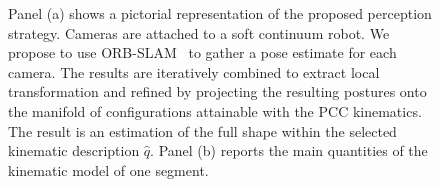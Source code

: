 \begin{figure}[ht]
     \centering
     \caption{Panel (a) shows a pictorial representation of the proposed perception strategy. Cameras are attached to a soft continuum robot. We propose to use ORB-SLAM~\citep{mur2017orb} to gather a pose estimate for each camera. The results are iteratively combined to extract local transformation and refined by projecting the resulting postures onto the manifold of configurations attainable with the \gls{PCC} kinematics. The result is an estimation of the full shape within the selected kinematic description $\hat{q}$. Panel (b) reports the main quantities of the kinematic model of one segment. }
\end{figure}